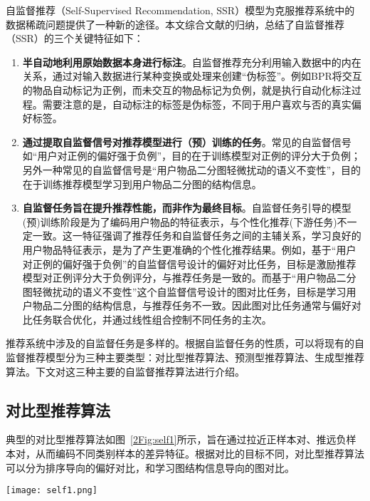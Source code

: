 自监督推荐（Self-Supervised  Recommendation,  SSR）模型为克服推荐系统中的数据稀疏问题提供了一种新的途径。本文综合文献\cite{Liu:2021:TKDE,SSR:2023:TKDE}的归纳，总结了自监督推荐（SSR）的三个关键特征如下：
\begin{enumerate}
\item \textbf{半自动地利用原始数据本身进行标注}。自监督推荐充分利用输入数据中的内在关系，通过对输入数据进行某种变换或处理来创建“伪标签”。例如BPR\cite{Steffen:2009:UAI}将交互的物品自动标记为正例，而未交互的物品标记为负例，就是执行自动化标注过程。需要注意的是，自动标注的标签是伪标签，不同于用户喜欢与否的真实偏好标签。

\item \textbf{通过提取自监督信号对推荐模型进行（预）训练的任务}。常见的自监督信号如“用户对正例的偏好强于负例”\cite{Steffen:2009:UAI}，目的在于训练模型对正例的评分大于负例；另外一种常见的自监督信号是“用户物品二分图轻微扰动的语义不变性”\cite{lightgcl:2023:ICLR}，目的在于训练推荐模型学习到用户物品二分图的结构信息。

\item \textbf{自监督任务旨在提升推荐性能，而非作为最终目标}。自监督任务引导的模型(预)训练阶段是为了编码用户物品的特征表示，与个性化推荐(下游任务)不一定一致。这一特征强调了推荐任务和自监督任务之间的主辅关系，学习良好的用户物品特征表示，是为了产生更准确的个性化推荐结果。例如，基于“用户对正例的偏好强于负例”的自监督信号设计的偏好对比任务，目标是激励推荐模型对正例评分大于负例评分，与推荐任务是一致的\cite{Steffen:2009:UAI,Jiancan:2022:arxiv}。而基于“用户物品二分图轻微扰动的语义不变性”这个自监督信号设计的图对比任务，目标是学习用户物品二分图的结构信息，与推荐任务不一致。因此图对比任务通常与偏好对比任务联合优化，并通过线性组合控制不同任务的主次\cite{10.1145/3543507.3583251,lightgcl:2023:ICLR}。
\end{enumerate}

推荐系统中涉及的自监督任务是多样的。根据自监督任务的性质，可以将现有的自监督推荐模型分为三种主要类型：对比型推荐算法、预测型推荐算法、生成型推荐算法。下文对这三种主要的自监督推荐算法进行介绍。
\vspace{-0.0011cm}
\subsection{对比型推荐算法}
\vspace{-0.0011cm}
典型的对比型推荐算法如图~\ref{2Fig:self1}所示，旨在通过拉近正样本对、推远负样本对，从而编码不同类别样本的差异特征。根据对比的目标不同，对比型推荐算法可以分为排序导向的偏好对比，和学习图结构信息导向的图对比。
\begin{figure*}[!]
	\centering
	\texttt{[image: self1.png]}
	\caption{典型的对比型推荐算法示意图}
	\label{2Fig:self1}
\end{figure*}
